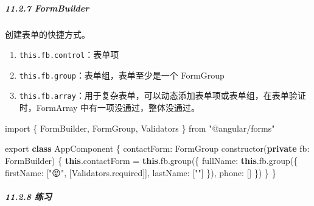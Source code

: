 \documentclass[
]{article}
\newenvironment{Shaded}{}{}
\newcommand{\AttributeTok}[1]{\textcolor[rgb]{0.49,0.56,0.16}{#1}}
\newcommand{\DataTypeTok}[1]{\textcolor[rgb]{0.56,0.13,0.00}{#1}}
\newcommand{\FunctionTok}[1]{\textcolor[rgb]{0.02,0.16,0.49}{#1}}
\newcommand{\ImportTok}[1]{#1}
\newcommand{\KeywordTok}[1]{\textcolor[rgb]{0.00,0.44,0.13}{\textbf{#1}}}
\newcommand{\NormalTok}[1]{#1}
\newcommand{\OperatorTok}[1]{\textcolor[rgb]{0.40,0.40,0.40}{#1}}
\newcommand{\StringTok}[1]{\textcolor[rgb]{0.25,0.44,0.63}{#1}}
\begin{document}
\hypertarget{1127-formbuilder}{%
\subparagraph{11.2.7 FormBuilder}\label{1127-formbuilder}}

创建表单的快捷方式。

\begin{enumerate}
\def\labelenumi{\arabic{enumi}.}
\item
  \texttt{this.fb.control}：表单项
\item
  \texttt{this.fb.group}：表单组，表单至少是一个 FormGroup
\item
  \texttt{this.fb.array}：用于复杂表单，可以动态添加表单项或表单组，在表单验证时，FormArray
  中有一项没通过，整体没通过。
\end{enumerate}

\begin{Shaded}
\begin{Highlighting}[]
\ImportTok{import}\NormalTok{ \{ FormBuilder}\OperatorTok{,}\NormalTok{ FormGroup}\OperatorTok{,}\NormalTok{ Validators \} }\ImportTok{from} \StringTok{"@angular/forms"}

\ImportTok{export} \KeywordTok{class}\NormalTok{ AppComponent \{}
  \DataTypeTok{contactForm}\OperatorTok{:}\NormalTok{ FormGroup}
  \FunctionTok{constructor}\NormalTok{(}\KeywordTok{private} \DataTypeTok{fb}\OperatorTok{:}\NormalTok{ FormBuilder) \{}
    \KeywordTok{this}\OperatorTok{.}\AttributeTok{contactForm} \OperatorTok{=} \KeywordTok{this}\OperatorTok{.}\AttributeTok{fb}\OperatorTok{.}\FunctionTok{group}\NormalTok{(\{}
      \DataTypeTok{fullName}\OperatorTok{:} \KeywordTok{this}\OperatorTok{.}\AttributeTok{fb}\OperatorTok{.}\FunctionTok{group}\NormalTok{(\{}
        \DataTypeTok{firstName}\OperatorTok{:}\NormalTok{ [}\StringTok{"😝"}\OperatorTok{,}\NormalTok{ [Validators}\OperatorTok{.}\AttributeTok{required}\NormalTok{]]}\OperatorTok{,}
        \DataTypeTok{lastName}\OperatorTok{:}\NormalTok{ [}\StringTok{""}\NormalTok{]}
\NormalTok{      \})}\OperatorTok{,}
      \DataTypeTok{phone}\OperatorTok{:}\NormalTok{ []}
\NormalTok{    \})}
\NormalTok{  \}}
\NormalTok{\}}
\end{Highlighting}
\end{Shaded}

\hypertarget{1128-ux7ec3ux4e60}{%
\subparagraph{11.2.8 练习}\label{1128-ux7ec3ux4e60}}
\end{document}
